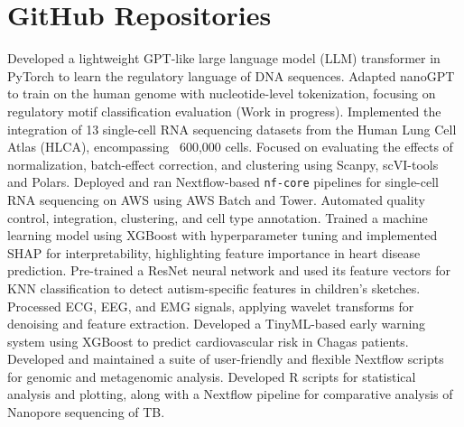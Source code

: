 \documentclass[11pt,a4paper,sans]{moderncv}
\begin{document}
\section{GitHub Repositories}
    {Developed a lightweight GPT-like large language model (LLM) transformer in PyTorch to learn the regulatory language of DNA sequences. Adapted nanoGPT to train on the human genome with nucleotide-level tokenization, focusing on regulatory motif classification evaluation (Work in progress).}{}{}
    {}
    {Implemented the integration of 13 single-cell RNA sequencing datasets from the Human Lung Cell Atlas (HLCA), encompassing ~600,000 cells. Focused on evaluating the effects of normalization, batch-effect correction, and clustering using Scanpy, scVI-tools and Polars.}{}{}
    {}
    {Deployed and ran Nextflow-based \texttt{nf-core} pipelines for single-cell RNA sequencing on AWS using AWS Batch and Tower. Automated quality control, integration, clustering, and cell type annotation.}{}{}
    {}
    {Trained a machine learning model using XGBoost with hyperparameter tuning and implemented SHAP for interpretability, highlighting feature importance in heart disease prediction.}{}{}
    {}  
    {Pre-trained a ResNet neural network and used its feature vectors for KNN classification to detect autism-specific features in children's sketches.}{}{}
    {}
    {Processed ECG, EEG, and EMG signals, applying wavelet transforms for denoising and feature extraction. Developed a TinyML-based early warning system using XGBoost to predict cardiovascular risk in Chagas patients.}{}{}
    {}
    {Developed and maintained a suite of user-friendly and flexible Nextflow scripts for genomic and metagenomic analysis.}{}{}
    {}
    {Developed R scripts for statistical analysis and plotting, along with a Nextflow pipeline for comparative analysis of Nanopore sequencing of TB.}{}{}
    {}
\end{document}
